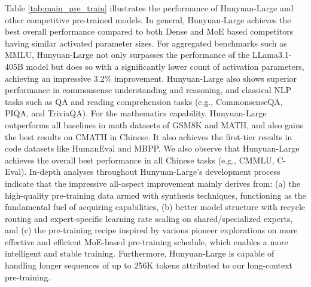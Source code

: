 \documentclass{article}
\begin{document}
Table \ref{tab:main_pre_train} illustrates the performance of Hunyuan-Large and other competitive pre-trained models. In general, Hunyuan-Large achieves the best overall performance compared to both Dense and MoE based competitors having similar activated parameter sizes.
For aggregated benchmarks such as MMLU, Hunyuan-Large not only surpasses the performance of the LLama3.1-405B model but does so with a significantly lower count of activation parameters, achieving an impressive 3.2\% improvement. Hunyuan-Large also shows superior performance in commonsense understanding and reasoning, and classical NLP tasks such as QA and reading comprehension tasks (e.g., CommonsenseQA, PIQA, and TriviaQA). For the mathematics capability, Hunyuan-Large outperforms all baselines in math datasets of GSM8K and MATH, and also gains the best results on CMATH in Chinese. It also achieves the first-tier results in code datasets like HumanEval and MBPP. We also observe that Hunyuan-Large achieves the overall best performance in all Chinese tasks (e.g., CMMLU, C-Eval).
In-depth analyses throughout Hunyuan-Large's development process indicate that the impressive all-aspect improvement mainly derives from: (a) the high-quality pre-training data armed with synthesis techniques, functioning as the fundamental fuel of acquiring capabilities, (b) better model structure with recycle routing and expert-specific learning rate scaling on shared/specialized experts, and (c) the pre-training recipe inspired by various pioneer explorations on more effective and efficient MoE-based pre-training schedule, which enables a more intelligent and stable training. Furthermore, Hunyuan-Large is capable of handling longer sequences of up to 256K tokens attributed to our long-context pre-training. 
\end{document}
